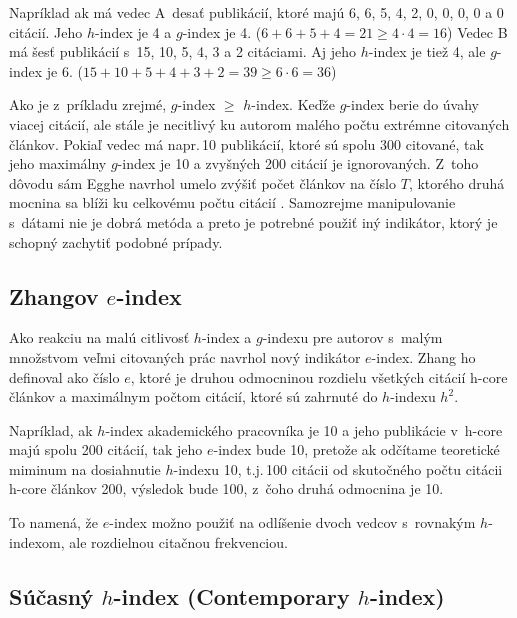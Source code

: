 Napríklad ak má vedec A~desať publikácií, ktoré majú 6, 6, 5, 4, 2, 0, 0, 0, 0 a
0 citácií.  Jeho $h$-index je 4 a $g$-index je 4.
($6+6+5+4 = 21 \geq 4\cdot4=16$) Vedec B má šesť publikácií s~15, 10, 5, 4, 3 a
2 citáciami.  Aj jeho $h$-index je tiež 4, ale $g$-index je 6.
($15+10+5+4+3+2 = 39 \geq 6\cdot6 = 36$)

Ako je z~príkladu zrejmé, $g$-index $\geq$ $h$-index.  Keďže $g$-index berie do
úvahy viacej citácií, ale stále je necitlivý ku autorom malého počtu extrémne
citovaných článkov.  Pokiaľ vedec má napr.\,10 publikácií, ktoré sú spolu 300
citované, tak jeho maximálny $g$-index je 10 a zvyšných 200 citácií je
ignorovaných.  Z~toho dôvodu sám Egghe navrhol umelo zvýšiť počet článkov na
číslo $T$, ktorého druhá mocnina sa blíži ku celkovému počtu citácií
\citep{Egghe2006}.  Samozrejme manipulovanie s~dátami nie je dobrá metóda a
preto je potrebné použiť iný indikátor, ktorý je schopný zachytiť podobné
prípady.


\subsection{Zhangov $e$-index}
\label{sec:e-index}

Ako reakciu na malú citlivosť $h$-index a $g$-indexu pre autorov s~malým
množstvom veľmi citovaných prác \citet{Zhang2009} navrhol nový indikátor
$e$-index.  Zhang ho definoval ako číslo $e$, ktoré je druhou odmocninou
rozdielu všetkých citácií h-core článkov a maximálnym počtom citácií, ktoré sú
zahrnuté do $h$-indexu $h^2$.

Napríklad, ak $h$-index akademického pracovníka je 10 a jeho publikácie v~h-core
majú spolu 200 citácií, tak jeho $e$-index bude 10, pretože ak odčítame
teoretické miminum na dosiahnutie $h$-indexu 10, t.j.\,100 citácii od skutočného
počtu citácii h-core článkov 200, výsledok bude 100, z~čoho druhá odmocnina je
10.

To namená, že $e$-index možno použiť na odlíšenie dvoch vedcov s~rovnakým
$h$-indexom, ale rozdielnou citačnou frekvenciou.


\subsection{Súčasný $h$-index (Contemporary $h$-index)}
\label{sec:hc-index}

